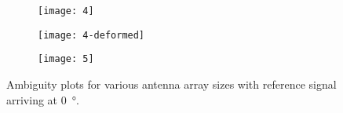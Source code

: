 \begin{figure}
  \centering
  \begin{subfigure}{\textwidth}
    \centering
    \texttt{[image: 4]}
  \end{subfigure}
  \begin{subfigure}{\textwidth}
    \centering
    \texttt{[image: 4-deformed]}
  \end{subfigure}
  \begin{subfigure}{\textwidth}
    \centering
    \texttt{[image: 5]}
  \end{subfigure}
  \caption{Ambiguity plots for various antenna array sizes with reference signal arriving at \SI{0}{\degree}.}
\end{figure}
